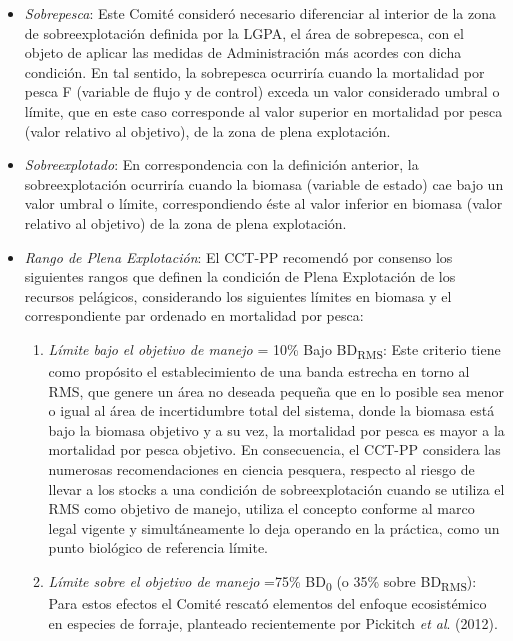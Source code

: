 \documentclass[
  spanish,
]{article}
\providecommand{\tightlist}{%
  \setlength{\itemsep}{0pt}\setlength{\parskip}{0pt}}
\begin{document}
\begin{itemize}
\item
  \emph{Sobrepesca}: Este Comité consideró necesario diferenciar al
  interior de la zona de sobreexplotación definida por la LGPA, el área
  de sobrepesca, con el objeto de aplicar las medidas de Administración
  más acordes con dicha condición. En tal sentido, la sobrepesca
  ocurriría cuando la mortalidad por pesca F (variable de flujo y de
  control) exceda un valor considerado umbral o límite, que en este caso
  corresponde al valor superior en mortalidad por pesca (valor relativo
  al objetivo), de la zona de plena explotación.
\item
  \emph{Sobreexplotado}: En correspondencia con la definición anterior,
  la sobreexplotación ocurriría cuando la biomasa (variable de estado)
  cae bajo un valor umbral o límite, correspondiendo éste al valor
  inferior en biomasa (valor relativo al objetivo) de la zona de plena
  explotación.
\item
  \emph{Rango de Plena Explotación}: El CCT-PP recomendó por consenso
  los siguientes rangos que definen la condición de Plena Explotación de
  los recursos pelágicos, considerando los siguientes límites en biomasa
  y el correspondiente par ordenado en mortalidad por pesca:

  \begin{enumerate}
  \def\labelenumi{\alph{enumi})}
  \tightlist
  \item
    \emph{Límite bajo el objetivo de manejo} = 10\% Bajo
    BD\textsubscript{RMS}: Este criterio tiene como propósito el
    establecimiento de una banda estrecha en torno al RMS, que genere un
    área no deseada pequeña que en lo posible sea menor o igual al área
    de incertidumbre total del sistema, donde la biomasa está bajo la
    biomasa objetivo y a su vez, la mortalidad por pesca es mayor a la
    mortalidad por pesca objetivo. En consecuencia, el CCT-PP considera
    las numerosas recomendaciones en ciencia pesquera, respecto al
    riesgo de llevar a los stocks a una condición de sobreexplotación
    cuando se utiliza el RMS como objetivo de manejo, utiliza el
    concepto conforme al marco legal vigente y simultáneamente lo deja
    operando en la práctica, como un punto biológico de referencia
    límite.
  \item
    \emph{Límite sobre el objetivo de manejo} =75\% BD\textsubscript{0}
    (o 35\% sobre BD\textsubscript{RMS}): Para estos efectos el Comité
    rescató elementos del enfoque ecosistémico en especies de forraje,
    planteado recientemente por Pickitch \emph{et al}. (2012).
  \end{enumerate}
\end{itemize}
\end{document}
